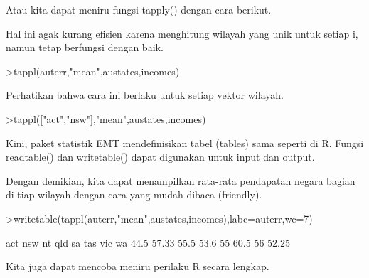 \documentclass{article}
\newenvironment{eulernotebook}{\par}{\par}
\newenvironment{eulercomment}{\par\medskip}{\par\medskip}
\begin{document}
\begin{eulernotebook}
\begin{eulercomment}
\begin{eulercomment}
\begin{eulercomment}
\begin{eulercomment}
\begin{eulercomment}
Atau kita dapat meniru fungsi tapply() dengan cara berikut.
\end{eulercomment}
\begin{eulercomment}
Hal ini agak kurang efisien karena menghitung wilayah yang unik untuk
setiap i, namun tetap berfungsi dengan baik.
\end{eulercomment}
\begin{eulerprompt}
>tappl(auterr,"mean",austates,incomes)
\end{eulerprompt}
\begin{euleroutput}
  [44.5,  57.3333,  55.5,  53.6,  55,  60.5,  56,  52.25]
\end{euleroutput}
\begin{eulercomment}
Perhatikan bahwa cara ini berlaku untuk setiap vektor wilayah.
\end{eulercomment}
\begin{eulerprompt}
>tappl(["act","nsw"],"mean",austates,incomes)
\end{eulerprompt}
\begin{euleroutput}
  [44.5,  57.3333]
\end{euleroutput}
\begin{eulercomment}
Kini, paket statistik EMT mendefinisikan tabel (tables) sama seperti
di R. Fungsi readtable() dan writetable() dapat digunakan untuk input
dan output.

Dengan demikian, kita dapat menampilkan rata-rata pendapatan negara
bagian di tiap wilayah dengan cara yang mudah dibaca (friendly).
\end{eulercomment}
\begin{eulerprompt}
>writetable(tappl(auterr,"mean",austates,incomes),labc=auterr,wc=7)
\end{eulerprompt}
\begin{euleroutput}
      act    nsw     nt    qld     sa    tas    vic     wa
     44.5  57.33   55.5   53.6     55   60.5     56  52.25
\end{euleroutput}
\begin{eulercomment}
Kita juga dapat mencoba meniru perilaku R secara lengkap.


\end{eulercomment}
\end{eulercomment}
\end{eulercomment}
\end{eulercomment}
\end{eulercomment}
\end{eulernotebook}
\end{document}
